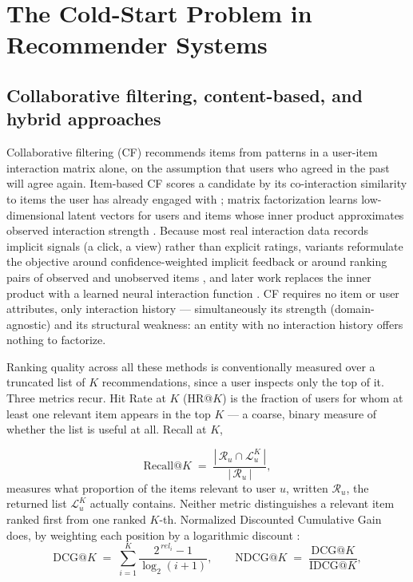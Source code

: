 \section{The Cold-Start Problem in Recommender Systems}
\label{sec:cold-start}

\subsection{Collaborative filtering, content-based, and hybrid approaches}
\label{sec:cf-content-hybrid}

Collaborative filtering (CF) recommends items from patterns in a user-item interaction matrix alone, on the assumption that users who agreed in the past will agree again. Item-based CF scores a candidate by its co-interaction similarity to items the user has already engaged with \citep{sarwar2001item}; matrix factorization learns low-dimensional latent vectors for users and items whose inner product approximates observed interaction strength \citep{koren2009matrix}. Because most real interaction data records implicit signals (a click, a view) rather than explicit ratings, variants reformulate the objective around confidence-weighted implicit feedback \citep{hu2008collaborative} or around ranking pairs of observed and unobserved items \citep{rendle2009bpr}, and later work replaces the inner product with a learned neural interaction function \citep{he2017neural}. CF requires no item or user attributes, only interaction history — simultaneously its strength (domain-agnostic) and its structural weakness: an entity with no interaction history offers nothing to factorize.

Ranking quality across all these methods is conventionally measured over a truncated list of $K$ recommendations, since a user inspects only the top of it. Three metrics recur. Hit Rate at $K$ (HR@$K$) is the fraction of users for whom at least one relevant item appears in the top $K$ — a coarse, binary measure of whether the list is useful at all. Recall at $K$,

\begin{equation}
\mathrm{Recall}@K \;=\; \frac{|\,\mathcal{R}_u \cap \mathcal{L}_u^{K}\,|}{|\,\mathcal{R}_u\,|},
\label{eq:recall-at-k}
\end{equation}
measures what proportion of the items relevant to user $u$, written $\mathcal{R}_u$, the returned list $\mathcal{L}_u^{K}$ actually contains. Neither metric distinguishes a relevant item ranked first from one ranked $K$-th. Normalized Discounted Cumulative Gain does, by weighting each position by a logarithmic discount \citep{jarvelin2002cumulated}:
\begin{equation}
\mathrm{DCG}@K \;=\; \sum_{i=1}^{K} \frac{2^{\,rel_i} - 1}{\log_2(i+1)},
\qquad
\mathrm{NDCG}@K \;=\; \frac{\mathrm{DCG}@K}{\mathrm{IDCG}@K},
\label{eq:ndcg}
\end{equation}

